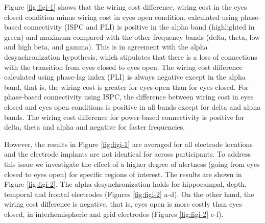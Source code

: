 \documentclass[11pt, onecolumn]{article}
\begin{document}
Figure \ref{fig:figi-1} shows that the wiring cost difference, wiring cost in the eyes closed condition minus wiring cost in eyes open condition, calculated using phase-based connectivity (ISPC and PLI) is positive in the alpha band (highlighted in green) and maximum compared with the other frequency bands (delta, theta, low and high beta, and gamma). This is in agreement with the alpha desynchronization hypothesis, which stipulates that there is a loss of connections with the transition from eyes closed to eyes open. 
The wiring cost difference calculated  using phase-lag index (PLI) is always  negative  except in the alpha band, that is, the wiring cost is greater  for eyes open than  for eyes closed. For  phase-based  connectivity using  ISPC, the  difference between wiring cost in eyes closed and eyes open conditions is positive  in all bands except for delta  and  alpha bands.  The wiring cost difference for power-based connectivity is positive  for  delta, theta and alpha and negative for faster frequencies.     

However, the results in Figure \ref{fig:figi-1} are averaged for all electrode locations and the electrode implants are not identical for across participants. 
To address this issue we investigate the effect of a higher degree of alertness (going from eyes closed to eyes open) for specific regions of interest. The results are shown in Figure \ref{fig:figi-2}.
The alpha desynchronization holds for hippocampal, depth, temporal and frontal electrodes (Figures \ref{fig:figi-2} a-d). On the other hand, the wiring cost difference is negative, that is, eyes open is more costly than eyes closed, in interhemispheric and grid electrodes (Figures \ref{fig:figi-2} e-f).

\end{document}
